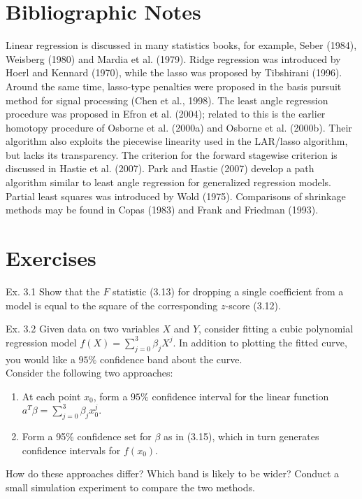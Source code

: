 \documentclass[10pt]{article}
\begin{document}
\section*{Bibliographic Notes}
Linear regression is discussed in many statistics books, for example, Seber (1984), Weisberg (1980) and Mardia et al. (1979). Ridge regression was introduced by Hoerl and Kennard (1970), while the lasso was proposed by Tibshirani (1996). Around the same time, lasso-type penalties were proposed in the basis pursuit method for signal processing (Chen et al., 1998). The least angle regression procedure was proposed in Efron et al. (2004); related to this is the earlier homotopy procedure of Osborne et al. (2000a) and Osborne et al. (2000b). Their algorithm also exploits the piecewise linearity used in the LAR/lasso algorithm, but lacks its transparency. The criterion for the forward stagewise criterion is discussed in Hastie et al. (2007). Park and Hastie (2007) develop a path algorithm similar to least angle regression for generalized regression models. Partial least squares was introduced by Wold (1975). Comparisons of shrinkage methods may be found in Copas (1983) and Frank and Friedman (1993).

\section*{Exercises}
Ex. 3.1 Show that the $F$ statistic (3.13) for dropping a single coefficient from a model is equal to the square of the corresponding $z$-score (3.12).

Ex. 3.2 Given data on two variables $X$ and $Y$, consider fitting a cubic polynomial regression model $f(X)=\sum_{j=0}^{3} \beta_{j} X^{j}$. In addition to plotting the fitted curve, you would like a $95 \%$ confidence band about the curve.\\
Consider the following two approaches:

\begin{enumerate}
  \item At each point $x_{0}$, form a $95 \%$ confidence interval for the linear function $a^{T} \beta=\sum_{j=0}^{3} \beta_{j} x_{0}^{j}$.
  \item Form a 95\% confidence set for $\beta$ as in (3.15), which in turn generates confidence intervals for $f\left(x_{0}\right)$.
\end{enumerate}

How do these approaches differ? Which band is likely to be wider? Conduct a small simulation experiment to compare the two methods.
\end{document}

